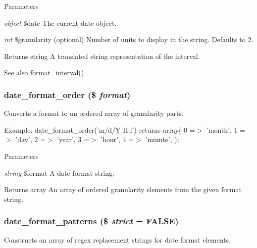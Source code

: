 \begin{DoxyParams}{Parameters}
\item[{\em object}]\$date The current date object. \item[{\em int}]\$granularity (optional) Number of units to display in the string. Defaults to 2.\end{DoxyParams}
\begin{DoxyReturn}{Returns}
string A translated string representation of the interval.
\end{DoxyReturn}
\begin{DoxySeeAlso}{See also}
format\_\-interval() 
\end{DoxySeeAlso}
\hypertarget{date__api_8module_afe15ee89e22483e9231870a55e689cbd}{
\subsubsection[{date\_\-format\_\-order}]{\setlength{\rightskip}{0pt plus 5cm}date\_\-format\_\-order (\$ {\em format})}}
\label{date__api_8module_afe15ee89e22483e9231870a55e689cbd}
Converts a format to an ordered array of granularity parts.

Example: date\_\-format\_\-order('m/d/Y H:i') returns array( 0 =$>$ 'month', 1 =$>$ 'day', 2 =$>$ 'year', 3 =$>$ 'hour', 4 =$>$ 'minute', );


\begin{DoxyParams}{Parameters}
\item[{\em string}]\$format A date format string.\end{DoxyParams}
\begin{DoxyReturn}{Returns}
array An array of ordered granularity elements from the given format string. 
\end{DoxyReturn}
\hypertarget{date__api_8module_a85d53d55109a56f5685f0c0ca0557a55}{
\subsubsection[{date\_\-format\_\-patterns}]{\setlength{\rightskip}{0pt plus 5cm}date\_\-format\_\-patterns (\$ {\em strict} = {\ttfamily FALSE})}}
\label{date__api_8module_a85d53d55109a56f5685f0c0ca0557a55}
Constructs an array of regex replacement strings for date format elements.


